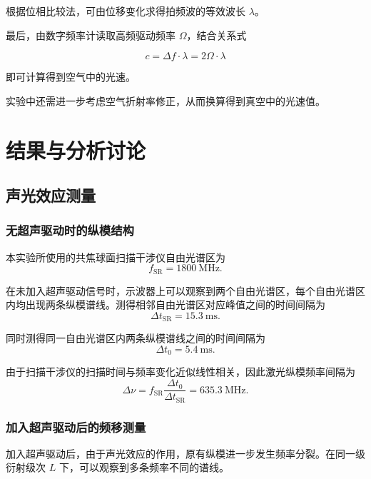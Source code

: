 \documentclass[a4paper]{ctexart}
\begin{document}
根据位相比较法，可由位移变化求得拍频波的等效波长 $\lambda$。

最后，由数字频率计读取高频驱动频率 $\Omega$，结合关系式

\begin{equation}
    c
    =
    \Delta f \cdot \lambda
    =
    2\Omega \cdot \lambda
\end{equation}

即可计算得到空气中的光速。

实验中还需进一步考虑空气折射率修正，从而换算得到真空中的光速值。

    \section{结果与分析讨论}

\subsection{声光效应测量}

\subsubsection{无超声驱动时的纵模结构}

本实验所使用的共焦球面扫描干涉仪自由光谱区为
\[
f_{\mathrm{SR}} = 1800\ \mathrm{MHz}.
\]

在未加入超声驱动信号时，示波器上可以观察到两个自由光谱区，每个自由光谱区内均出现两条纵模谱线。测得相邻自由光谱区对应峰值之间的时间间隔为
\begin{equation}
    \Delta t_{\mathrm{SR}} = 15.3\ \mathrm{ms}.
\end{equation}

同时测得同一自由光谱区内两条纵模谱线之间的时间间隔为
\begin{equation}
    \Delta t_0 = 5.4\ \mathrm{ms}.
\end{equation}

由于扫描干涉仪的扫描时间与频率变化近似线性相关，因此激光纵模频率间隔为
\begin{equation}
    \Delta \nu
    =
    f_{\mathrm{SR}}
    \frac{\Delta t_0}{\Delta t_{\mathrm{SR}}}
    =
    635.3\ \mathrm{MHz}.
\end{equation}


\subsubsection{加入超声驱动后的频移测量}

加入超声驱动后，由于声光效应的作用，原有纵模进一步发生频率分裂。在同一级衍射级次 $L$ 下，可以观察到多条频率不同的谱线。
\end{document}
